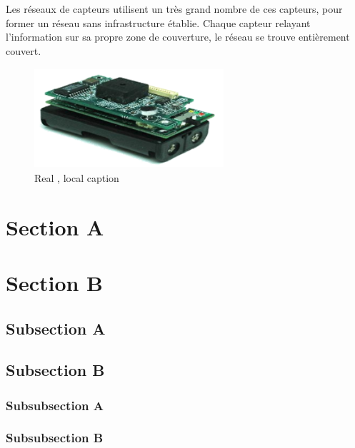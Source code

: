 Les réseaux de capteurs utilisent un très grand nombre de ces capteurs, pour former un réseau sans infrastructure établie. Chaque capteur relayant l'information sur sa propre zone de couverture, le réseau se trouve entièrement couvert.

\begin{figure}[h]
	\centering
	\includegraphics[width=7cm,height=3.7cm]{Chap1/chap1.png}
	\caption[Optinal caption]{Real , local caption}
	\label{fig:tobias2}
\end{figure}

\section{Section A}
\section{Section B}
\subsection{Subsection A}
\subsection{Subsection B}
\subsubsection{Subsubsection A}
\subsubsection{Subsubsection B}
